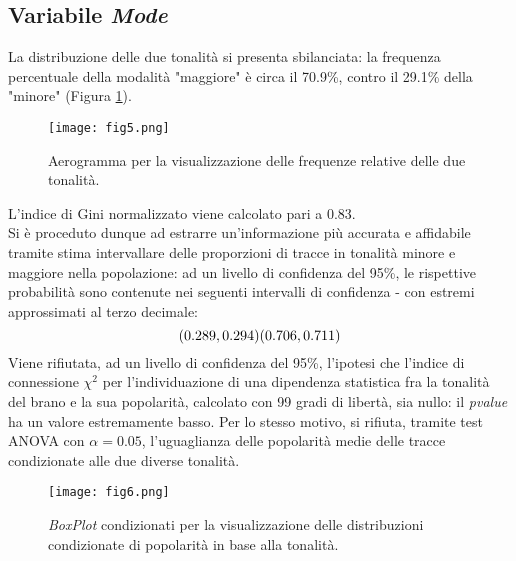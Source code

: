 \documentclass[fleqn,10pt]{SelfArx} %
\begin{document}
\subsection*{Variabile \textit{Mode}}
La distribuzione delle due tonalità si presenta sbilanciata: la frequenza percentuale della modalità "maggiore" è circa il 70.9\%, contro il 29.1\% della "minore" (Figura \ref{fig:fig5}).
\begin{figure}[H]
    \centering
    \texttt{[image: fig5.png]}
    \caption{Aerogramma per la visualizzazione delle frequenze relative delle due tonalità.}
    \label{fig:fig5}
\end{figure}
L'indice di Gini normalizzato viene calcolato pari a 0.83.\\
Si è proceduto dunque ad estrarre un'informazione più accurata e affidabile tramite stima intervallare delle proporzioni di tracce in tonalità minore e maggiore nella popolazione: ad un livello di confidenza del 95\%, le rispettive probabilità sono contenute nei seguenti intervalli di confidenza - con estremi approssimati al terzo decimale:
\begin{equation}
    (0.289, 0.294)\\(0.706, 0.711)
\end{equation}
Viene rifiutata, ad un livello di confidenza del 95\%, l'ipotesi che l'indice di connessione $\chi^2$ per l'individuazione di una dipendenza statistica fra la tonalità del brano e la sua popolarità, calcolato con 99 gradi di libertà, sia nullo: il \textit{pvalue} ha un valore estremamente basso. Per lo stesso motivo, si rifiuta, tramite test ANOVA con $\alpha=0.05$, l'uguaglianza delle popolarità medie delle tracce condizionate alle due diverse tonalità.
\begin{figure}[H]
    \centering
    \texttt{[image: fig6.png]}
    \caption{\textit{BoxPlot} condizionati per la visualizzazione delle distribuzioni condizionate di popolarità in base alla tonalità.}
    \label{fig:fig6}
\end{figure}
\end{document}

